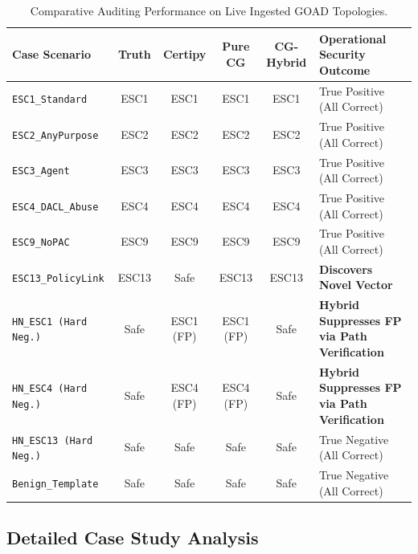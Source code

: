 \begin{table}[ht]
\centering
\small
\caption{Comparative Auditing Performance on Live Ingested GOAD Topologies.}
\label{tab:goad_results}
\begin{tabularx}{\textwidth}{p{3.0cm} c c c c X}
\toprule
\textbf{Case Scenario} & \textbf{Truth} & \textbf{Certipy} & \textbf{Pure CG} & \textbf{CG-Hybrid} & \textbf{Operational Security Outcome} \\
\midrule
\texttt{ESC1\_Standard} & ESC1 & ESC1 & ESC1 & ESC1 & True Positive (All Correct) \\
\texttt{ESC2\_AnyPurpose} & ESC2 & ESC2 & ESC2 & ESC2 & True Positive (All Correct) \\
\texttt{ESC3\_Agent} & ESC3 & ESC3 & ESC3 & ESC3 & True Positive (All Correct) \\
\texttt{ESC4\_DACL\_Abuse} & ESC4 & ESC4 & ESC4 & ESC4 & True Positive (All Correct) \\
\texttt{ESC9\_NoPAC} & ESC9 & ESC9 & ESC9 & ESC9 & True Positive (All Correct) \\
\texttt{ESC13\_PolicyLink} & ESC13 & Safe & ESC13 & ESC13 & \textbf{Discovers Novel Vector} \\
\texttt{HN\_ESC1 (Hard Neg.)} & Safe & ESC1 (FP) & ESC1 (FP) & Safe & \textbf{Hybrid Suppresses FP via Path Verification} \\
\texttt{HN\_ESC4 (Hard Neg.)} & Safe & ESC4 (FP) & ESC4 (FP) & Safe & \textbf{Hybrid Suppresses FP via Path Verification} \\
\texttt{HN\_ESC13 (Hard Neg.)} & Safe & Safe & Safe & Safe & True Negative (All Correct) \\
\texttt{Benign\_Template} & Safe & Safe & Safe & Safe & True Negative (All Correct) \\
\bottomrule
\end{tabularx}
\end{table}

\subsection{Detailed Case Study Analysis}

